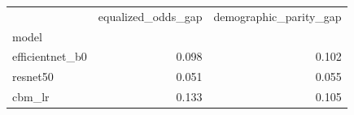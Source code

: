\begin{tabular}{lrr}
\toprule
 & equalized_odds_gap & demographic_parity_gap \\
model &  &  \\
\midrule
efficientnet_b0 & 0.098 & 0.102 \\
resnet50 & 0.051 & 0.055 \\
cbm_lr & 0.133 & 0.105 \\
\bottomrule
\end{tabular}

